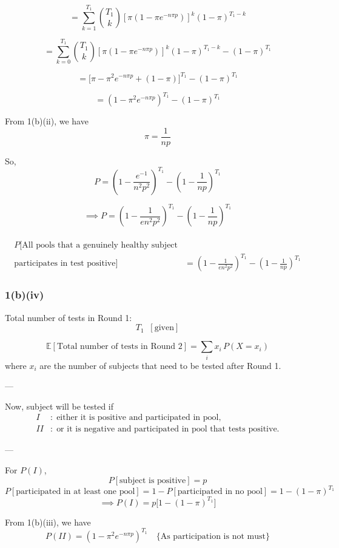 \documentclass[12pt]{article}
\begin{document}
\[
= \sum_{k=1}^{T_1} \binom{T_1}{k} 
\left[\pi \left(1 - \pi e^{-n\pi p}\right)\right]^k 
(1-\pi)^{T_1-k}
\]

\[
= \sum_{k=0}^{T_1} \binom{T_1}{k} 
\left[\pi \left(1 - \pi e^{-n\pi p}\right)\right]^k 
(1-\pi)^{T_1-k}
- (1-\pi)^{T_1}
\]

\[
= \Big[\pi - \pi^2 e^{-n\pi p} + (1-\pi)\Big]^{T_1} - (1-\pi)^{T_1}
\]

\[
= \left(1 - \pi^2 e^{-n\pi p}\right)^{T_1} - (1-\pi)^{T_1}
\]


From 1(b)(ii), we have
\[
\pi = \frac{1}{np}
\]

So,
\[
P = \left(1 - \frac{e^{-1}}{n^2 p^2}\right)^{T_1} 
- \left(1 - \frac{1}{np}\right)^{T_1}
\]

\[
\implies P = \left(1 - \frac{1}{e n^2 p^2}\right)^{T_1} 
- \left(1 - \frac{1}{np}\right)^{T_1}
\]
\\
\[
\boxed{
\begin{aligned}
  P\big[\text{All pools that a genuinely healthy subject}\\
  \text{participates in test positive}\big]
  &= \left(1 - \frac{1}{e n^2 p^2}\right)^{T_1} 
     - \left(1 - \frac{1}{np}\right)^{T_1}
\end{aligned}
}
\]
\subsubsection{1(b)(iv)}

Total number of tests in Round 1:
\[
T_1 \; \; [\text{given}]
\]

\[
\mathbb{E}[\text{Total number of tests in Round 2}] 
= \sum_i x_i \, P(X = x_i)
\]
where $x_i$ are the number of subjects that need to be tested after Round 1.

---

Now, subject will be tested if  
\[
\begin{aligned}
I &: \; \text{either it is positive and participated in pool}, \\
II &: \; \text{or it is negative and participated in pool that tests positive}.
\end{aligned}
\]

---

For $P(I)$,  
\[
P[\text{subject is positive}] = p
\]
\[
P[\text{participated in at least one pool}] = 1 - P[\text{participated in no pool}]
= 1 - (1-\pi)^{T_1}
\]
\[
\implies P(I) = p \Big[ 1 - (1-\pi)^{T_1} \Big]
\]

From 1(b)(iii), we have
\[
P(II) = (1 - \pi^2 e^{-n\pi p})^{T_1} 
\quad \Big\{ \text{As participation is not must} \Big\}
\]
\end{document}
